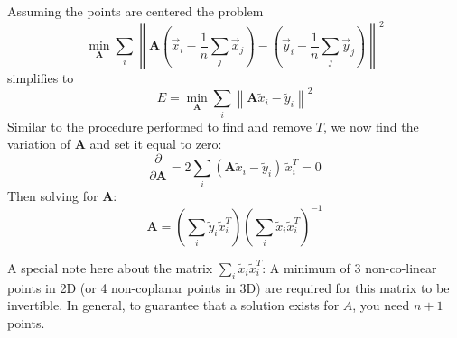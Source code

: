 Assuming the points are centered the problem
\begin{equation}
\underset{\mathbf{A}}{\min}\sum_i\left\|\mathbf{A}\left(\vec{x}_i-\frac{1}{n}\sum_j \vec{x}_j\right) - \left(\vec{y}_i-\frac{1}{n}\sum_j \vec{y}_j\right)\right\|^2
\end{equation}
simplifies to
\begin{equation}
E = \underset{\mathbf{A}}{\min}\sum_i\left\|\mathbf{A}\tilde{x}_i - \tilde{y}_i\right\|^2 
\end{equation}
Similar to the procedure performed to find and remove $T$, we now find the variation of $\mathbf{A}$ and set it equal to zero:
\begin{equation}
\frac{\partial}{\partial\mathbf{A}} = 2 \sum_i \left(\mathbf{A}\tilde{x}_i-\tilde{y}_i\right)\, \tilde{x}_i^T = 0
\end{equation}
Then solving for $\mathbf{A}$:
\begin{equation}
\mathbf{A}=\left(\sum_i\tilde{y}_i\tilde{x}_i^T\right)\left(\sum_i\tilde{x}_i\tilde{x}_i^T\right)^{-1}
\end{equation}

A special note here about the matrix $\sum_i\tilde{x}_i\tilde{x}_i^T$: A minimum of 3 non-co-linear points in 2D (or 4 non-coplanar points in 3D) are required for this matrix to be invertible. In general, to guarantee that a solution exists for $A$, you need $n+1$ points.

